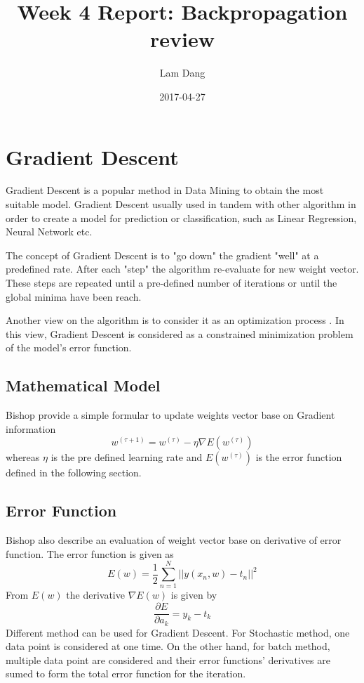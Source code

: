 \documentclass{article}
\title{Week 4 Report: Backpropagation review}
\date{2017-04-27}
\author{Lam Dang}
\begin{document}
\maketitle
\newpage
{}
\section{Gradient Descent}
Gradient Descent is a popular method in Data Mining to obtain the most suitable model. Gradient Descent usually used in tandem with other algorithm in order to create a model for prediction or classification, such as Linear Regression, Neural Network etc. \par
The concept of Gradient Descent is to "go down" the gradient "well" at a predefined rate. After each "step" the algorithm re-evaluate for new weight vector. These steps are repeated until a pre-defined number of iterations or until the global minima have been reach. \cite{bishop_pattern_2006}\par
Another view on the algorithm is to consider it as an optimization process \cite{lecun_theoretical_1992}. In this view, Gradient Descent is considered as a constrained minimization problem of the model's error function.
\subsection{Mathematical Model}
Bishop \cite[p240]{bishop_pattern_2006} provide a simple formular to update weights vector base on Gradient information
\begin{equation}
w^{(\tau+1)} = w^{(\tau)} - \eta \nabla E (w^{(\tau)})
\end{equation}
whereas $\eta$ is the pre defined learning rate and $E (w^{(\tau)})$ is the error function defined in the following section.
\subsection{Error Function}
Bishop \cite[p242]{bishop_pattern_2006} also describe an evaluation of weight vector base on derivative of error function. The error function is given as
\begin{equation}
E(w) = \frac{1}{2} \sum_{n=1}^N || y(x_n,w)-t_n||^2
\end{equation}
From $E(w)$ the derivative $\nabla E(w)$ is given by
\begin{equation}
\frac{\partial E}{\partial a_k} = y_k - t_k
\end{equation}
Different method can be used for Gradient Descent. For Stochastic method, one data point is considered at one time. On the other hand, for batch method, multiple data point are considered and their error functions' derivatives are sumed to form the total error function for the iteration.
\end{document}
